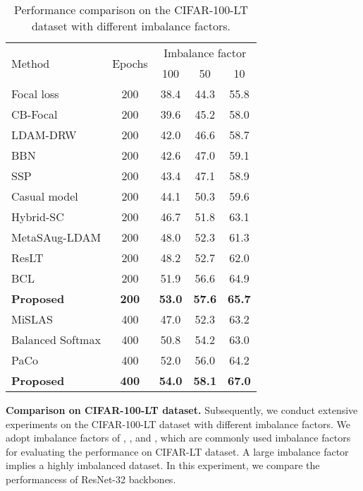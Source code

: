 \documentclass{article}
\theoremstyle{plain}
\theoremstyle{definition}
\theoremstyle{remark}
\begin{document}
\begin{table}[t]
\centering
\caption{Performance comparison on the CIFAR-100-LT dataset with different imbalance factors.}
\begin{tabular}{l|c|ccc}
\hline
\multirow{2}{*}{Method}          & \multirow{2}{*}{Epochs} & \multicolumn{3}{c}{Imbalance factor}          \\ \cline{3-5} 
                                 &                         & 100           & 50            & 10            \\ \hline
Focal loss          & 200                     & 38.4          & 44.3          & 55.8          \\
CB-Focal            & 200                     & 39.6          & 45.2          & 58.0          \\
LDAM-DRW         & 200                     & 42.0          & 46.6          & 58.7          \\
BBN                  & 200                     & 42.6          & 47.0          & 59.1          \\
SSP           & 200                     & 43.4          & 47.1          & 58.9          \\
Casual model        & 200                     & 44.1          & 50.3          & 59.6          \\
Hybrid-SC    & 200                     & 46.7          & 51.8          & 63.1          \\
MetaSAug-LDAM     & 200                     & 48.0          & 52.3          & 61.3          \\
ResLT               & 200                     & 48.2          & 52.7          & 62.0          \\
BCL              & 200                     & 51.9          & 56.6          & 64.9          \\
\textbf{Proposed}                & \textbf{200}            & \textbf{53.0} & \textbf{57.6} & \textbf{65.7} \\ \hline
MiSLAS        & 400                     & 47.0          & 52.3          & 63.2          \\
Balanced Softmax & 400                     & 50.8          & 54.2          & 63.0          \\
PaCo           & 400                     & 52.0          & 56.0          & 64.2          \\
\textbf{Proposed}                & \textbf{400}            & \textbf{54.0} & \textbf{58.1} & \textbf{67.0} \\ \hline
\end{tabular}


%
 \label{tab:cifar100lt}
\end{table}
\textbf{Comparison on CIFAR-100-LT dataset.} Subsequently, we conduct extensive experiments on the CIFAR-100-LT dataset with different imbalance factors. We adopt imbalance factors of , , and , which are commonly used imbalance factors for evaluating the performance on CIFAR-LT dataset. A large imbalance factor implies a highly imbalanced dataset. In this experiment, we compare the performancess of ResNet-32 backbones.
\end{document}
